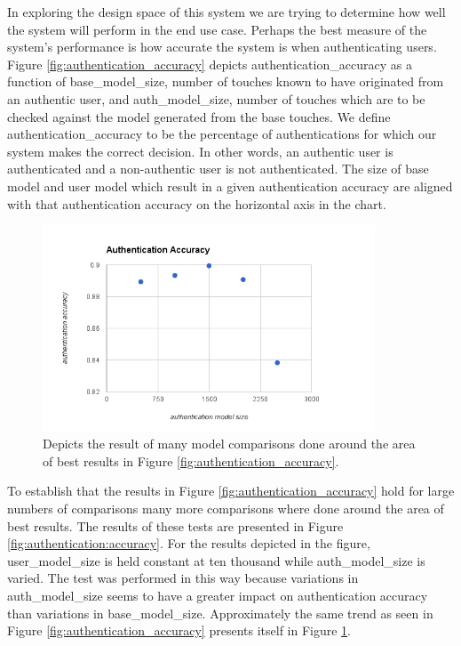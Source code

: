 \documentclass{acm_proc_article-sp}
\begin{document}
%
In exploring the design space of this system we are trying to determine how well the system will perform in the end use case. Perhaps the best measure of the system's performance is how accurate the system is when authenticating users. Figure \ref{fig:authentication_accuracy} depicts authentication\_accuracy as a function of base\_model\_size, number of touches known to have originated from an authentic user, and auth\_model\_size, number of touches which are to be checked against the model generated from the base touches. We define authentication\_accuracy to be the percentage of authentications for which our system makes the correct decision. In other words, an authentic user is authenticated and a non-authentic user is not authenticated. The size of base model and user model which result in a given authentication accuracy are aligned with that authentication accuracy on the horizontal axis in the chart. 

\begin{figure}
\centering
\includegraphics[width=3.9in]{extensive_authentication_accuracy.png}
\caption{Depicts the result of many model comparisons done around the area of best results in Figure \ref{fig:authentication_accuracy}.}
\label{fig:extensive_authentication_accuracy}
\end{figure}

%
To establish that the results in Figure \ref{fig:authentication_accuracy} hold for large numbers of comparisons many more comparisons where done around the area of best results. The results of these tests are presented in Figure \ref{fig:authentication:accuracy}. For the results depicted in the figure, user\_model\_size is held constant at ten thousand while auth\_model\_size is varied. The test was performed in this way because variations in auth\_model\_size seems to have a greater impact on authentication accuracy than variations in base\_model\_size. Approximately the same trend as seen in Figure \ref{fig:authentication_accuracy} presents itself in Figure \ref{fig:extensive_authentication_accuracy}.
\end{document}
